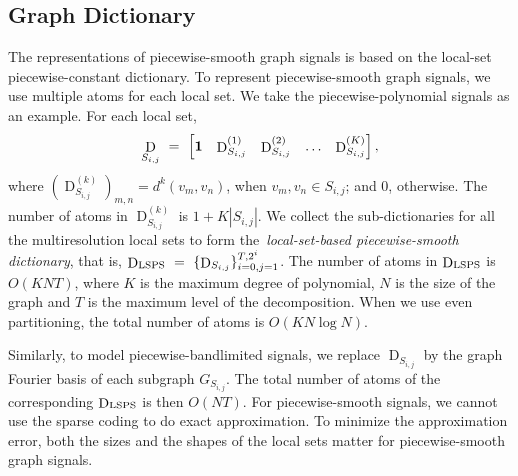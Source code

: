 \documentclass[journal,twocolumn,10pt]{IEEEtran}
\theoremstyle{definition}
\DeclareMathOperator{\D}{D}
\begin{document}
\subsection{Graph Dictionary}
\label{ssec:Graph_D}
The representations of piecewise-smooth graph signals is based on the local-set piecewise-constant dictionary. To represent piecewise-smooth graph signals, we use multiple atoms for each local set. We take the piecewise-polynomial signals as an example. For each local set, 
\begin{equation*}
	\D_{S_{i, j}}   \ = \ \begin{bmatrix}
	{\bf 1}  &  \D^{(1)}_{S_{i, j}}  &  \D^{(2)}_{S_{i, j}}   &  \ldots &  \D^{(K)}_{S_{i, j}} 
	\end{bmatrix},
\end{equation*}
where  $(  \D_{S_{i, j}}^{(k)} )_{m,n}  = d^k(v_m, v_n)$, when $v_m, v_n \in S_{i,j}$; and 0, otherwise. The number of atoms in $\D_{S_{i, j}}^{(k)}$ is $1+K |S_{i,j}|$. We collect the sub-dictionaries for all the multiresolution local sets to form the~\emph{local-set-based piecewise-smooth dictionary}, that is,
$ \D_{\rm LSPS}~=~\{ \D_{S_{i, j}}  \}_{i=0, j = 1}^{T,  2^i} $. The number of atoms in $\D_{\rm LSPS}$ is $O(K N T)$, where $K$ is the maximum degree of polynomial, $N$ is the size of the graph and $T$ is the maximum level of the decomposition. When we use  even partitioning, the total number of atoms is $O(K N \log N)$.



Similarly, to model piecewise-bandlimited signals, we replace $\D_{S_{i, j}}$ by the graph Fourier basis of each subgraph $G_{S_{i,j}}$. The total number of atoms of the corresponding $\D_{\rm LSPS}$ is then $O(N T)$. For piecewise-smooth signals, we cannot use the sparse coding to do exact approximation. To minimize the approximation error, both the sizes and the shapes of the local sets matter for piecewise-smooth graph signals.
\end{document}
